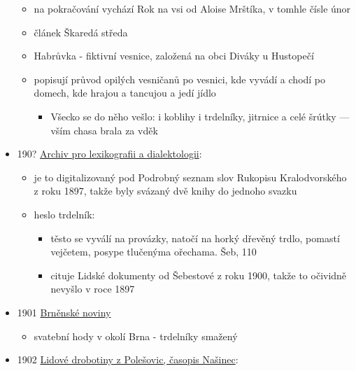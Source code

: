 \begin{itemize}
  \begin{itemize}
  \tightlist
  \item
    na pokračování vychází Rok na vsi od Aloise Mrštíka, v tomhle čísle
    únor
  \item
    článek Škaredá středa
  \item
    Habrůvka - fiktivní vesnice, založená na obci Diváky u Hustopečí
  \item
    popisují průvod opilých vesničanů po vesnici, kde vyvádí a chodí po
    domech, kde hrajou a tancujou a jedí jídlo

    \begin{itemize}
    \tightlist
    \item
      Všecko se do něho vešlo: i koblihy i trdelníky, jitrnice a celé
      šrútky --- vším chasa brala za vděk
    \end{itemize}
  \end{itemize}
\item
  190?
  \href{https://ceskadigitalniknihovna.cz/uuid/uuid:225c96bf-3ac7-4d81-addb-3ab9562be388}{Archiv
  pro lexikografii a dialektologii}:

  \begin{itemize}
  \tightlist
  \item
    je to digitalizovaný pod Podrobný seznam slov Rukopisu
    Kralodvorského z roku 1897, takže byly svázaný dvě knihy do jednoho
    svazku
  \item
    heslo trdelník:

    \begin{itemize}
    \tightlist
    \item
      těsto se vyválí na provázky, natočí na horký dřevěný trdlo,
      pomastí vejčetem, posype tlučenýma ořechama. Šeb, 110
    \item
      cituje Lidské dokumenty od Šebestové z roku 1900, takže to
      očividně nevyšlo v roce 1897
    \end{itemize}
  \end{itemize}
\item
  1901
  \href{https://ndk.cz/view/uuid:c714e5a0-81eb-11e3-a70e-005056822549?page=uuid\%3A884b7690-8641-11e3-b315-001018b5eb5c&fulltext=trdeln\%C3\%ADky}{Brněnské
  noviny}

  \begin{itemize}
  \tightlist
  \item
    svatební hody v okolí Brna - trdelníky smažený
  \end{itemize}
\item
  1902
  \href{https://ceskadigitalniknihovna.cz/view/uuid:51ede477-8259-11e0-b92b-0050569d679d?page=uuid\%3A540811e9-8259-11e0-b92b-0050569d679d&fulltext=trdeln\%C3\%ADk\%20OR\%20trdeln\%C3\%ADky\%20OR\%20trdeln\%C3\%ADk\%C5\%AF&source=mzk}{Lidové
  drobotiny z Polešovic, časopis Našinec}:


\end{itemize}

